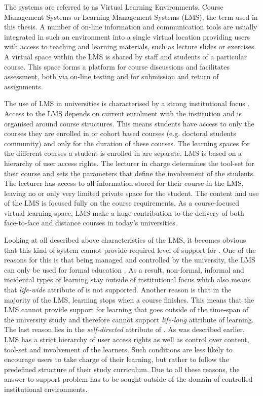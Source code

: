 The systems are referred to as Virtual Learning Environments, Course Management
Systems or Learning Management Systems (LMS), the term used in this thesis. A
number of on-line information and communication tools are usually integrated in
such an environment into a single virtual location \citep{Morgan-Klein2007}
providing users with access to teaching and learning materials, such as lecture
slides or exercises. A virtual space within the LMS is shared by staff and
students of a particular course. This space forms a platform for course
discussions and facilitates assessment, both via on-line testing and for
submission and return of assignments.

The use of LMS in universities is characterised by a strong institutional focus
\citep{Siemens2004}. Access to the LMS depends on current enrolment with the
institution and is organised around course structures. This means students have
access to only the courses they are enrolled in or cohort based courses (e.g.
doctoral students community) and only for the duration of these courses. The
learning spaces for the different courses a student is enrolled in are separate.
LMS is based on a hierarchy of user access rights. The lecturer in charge
determines the tool-set for their course and sets the parameters that define the
involvement of the students. The lecturer has access to all information stored
for their course in the LMS, leaving no or only very limited private space for
the student. The content and use of the LMS is focused fully on the course
requirements. As a course-focused virtual learning space, LMS make a huge
contribution to the delivery of both face-to-face and distance courses in
today's universities.

Looking at all described above characteristics of the LMS, it becomes obvious
that this kind of system cannot provide required level of support for \LLLsn.
One of the reasons for this is that being managed and controlled by the
university, the LMS can only be used for formal education \citep{Venable2011}.
As a result, non-formal, informal and incidental types of learning stay outside
of institutional focus which also means that \textit{life-wide} attribute of
\LLLs is not supported. Another reason is that in the majority of the LMS,
learning stops when a course finishes. This means that the LMS cannot provide
support for learning that goes outside of the time-span of the university study
and therefore cannot support \textit{life-long} attribute of learning. The last
reason lies in the \textit{self-directed} attribute of \LLLsn. As was described
earlier, LMS has a strict hierarchy of user access rights as well as control
over content, tool-set and involvement of the learners. Such conditions are
less likely to encourage users to take charge of their learning, but rather to
follow the predefined structure of their study curriculum. Due to all these
reasons, the answer to \LLLs support problem has to be sought outside of the
domain of controlled institutional environments.

